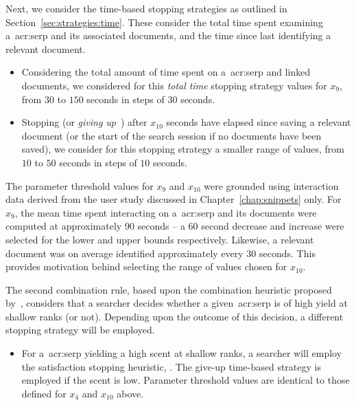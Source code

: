 Next, we consider the time-based stopping strategies as outlined in Section~\ref{sec:strategies:time}. These consider the total time spent examining a~\gls{acr:serp} and its associated documents, and the time since last identifying a relevant document.

\begin{itemize}
    \item{ Considering the total amount of time spent on a~\gls{acr:serp} and linked documents, we considered for this \emph{total time} stopping strategy values for $x_9$, from $30$ to $150$ seconds in steps of $30$ seconds.}
    
    \item{ Stopping (or \emph{giving up}~\citep{krebs1974leave_after_rule}) after $x_{10}$ seconds have elapsed since saving a relevant document (or the start of the search session if no documents have been saved), we consider for this stopping strategy a smaller range of values, from $10$ to $50$ seconds in steps of $10$ seconds.}
\end{itemize}

The parameter threshold values for $x_9$ and $x_{10}$ were grounded using interaction data derived from the user study discussed in Chapter~\ref{chap:snippets} only. For $x_9$, the mean time spent interacting on a~\gls{acr:serp} and its documents were computed at approximately $90$ seconds -- a $60$ second decrease and increase were selected for the lower and upper bounds respectively. Likewise, a relevant document was on average identified approximately every $30$ seconds. This provides motivation behind selecting the range of values chosen for $x_{10}$.

The second combination rule, based upon the combination heuristic proposed by~\cite{mcnair1982gut_mvt}, considers that a searcher decides whether a given~\gls{acr:serp} is of high yield at shallow ranks (or not). Depending upon the outcome of this decision, a different stopping strategy will be employed.

\begin{itemize}
    \item{ For a~\gls{acr:serp} yielding a high scent at shallow ranks, a searcher will employ the satisfaction stopping heuristic, . The give-up time-based strategy  is employed if the scent is low. Parameter threshold values are identical to those defined for $x_4$ and $x_{10}$ above.}
\end{itemize}

